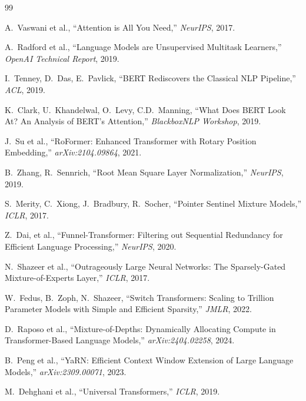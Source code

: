 \documentclass[11pt,a4paper]{article}
\theoremstyle{definition}
\theoremstyle{plain}
\theoremstyle{remark}
\begin{document}
\begin{thebibliography}{99}

A.~Vaswani et al., ``Attention is All You Need,'' \textit{NeurIPS}, 2017.

A.~Radford et al., ``Language Models are Unsupervised Multitask Learners,'' 
\textit{OpenAI Technical Report}, 2019.

I.~Tenney, D.~Das, E.~Pavlick, ``BERT Rediscovers the Classical NLP 
Pipeline,'' \textit{ACL}, 2019.

K.~Clark, U.~Khandelwal, O.~Levy, C.D.~Manning, ``What Does BERT Look At? 
An Analysis of BERT's Attention,'' \textit{BlackboxNLP Workshop}, 2019.

J.~Su et al., ``RoFormer: Enhanced Transformer with Rotary Position 
Embedding,'' \textit{arXiv:2104.09864}, 2021.

B.~Zhang, R.~Sennrich, ``Root Mean Square Layer Normalization,'' 
\textit{NeurIPS}, 2019.

S.~Merity, C.~Xiong, J.~Bradbury, R.~Socher, ``Pointer Sentinel Mixture 
Models,'' \textit{ICLR}, 2017.

Z.~Dai, et al., ``Funnel-Transformer: Filtering out Sequential Redundancy 
for Efficient Language Processing,'' \textit{NeurIPS}, 2020.

N.~Shazeer et al., ``Outrageously Large Neural Networks: The 
Sparsely-Gated Mixture-of-Experts Layer,'' \textit{ICLR}, 2017.

W.~Fedus, B.~Zoph, N.~Shazeer, ``Switch Transformers: Scaling to Trillion 
Parameter Models with Simple and Efficient Sparsity,'' \textit{JMLR}, 2022.

D.~Raposo et al., ``Mixture-of-Depths: Dynamically Allocating Compute in 
Transformer-Based Language Models,'' \textit{arXiv:2404.02258}, 2024.

B.~Peng et al., ``YaRN: Efficient Context Window Extension of Large 
Language Models,'' \textit{arXiv:2309.00071}, 2023.

M.~Dehghani et al., ``Universal Transformers,'' \textit{ICLR}, 2019.


\end{thebibliography}
\end{document}
